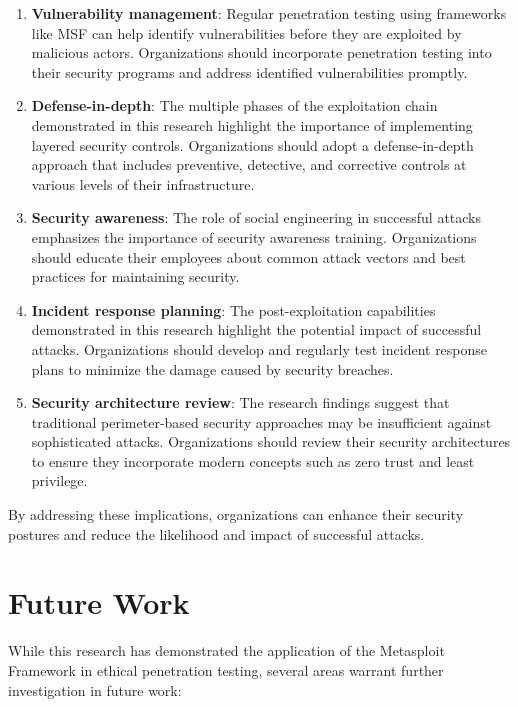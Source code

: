 \documentclass[journal,twoside]{IEEEtran}
\begin{document}
\begin{enumerate}
    \item \textbf{Vulnerability management}: Regular penetration testing using frameworks like MSF can help identify vulnerabilities before they are exploited by malicious actors. Organizations should incorporate penetration testing into their security programs and address identified vulnerabilities promptly.
    
    \item \textbf{Defense-in-depth}: The multiple phases of the exploitation chain demonstrated in this research highlight the importance of implementing layered security controls. Organizations should adopt a defense-in-depth approach that includes preventive, detective, and corrective controls at various levels of their infrastructure.
    
    \item \textbf{Security awareness}: The role of social engineering in successful attacks emphasizes the importance of security awareness training. Organizations should educate their employees about common attack vectors and best practices for maintaining security.
    
    \item \textbf{Incident response planning}: The post-exploitation capabilities demonstrated in this research highlight the potential impact of successful attacks. Organizations should develop and regularly test incident response plans to minimize the damage caused by security breaches.
    
    \item \textbf{Security architecture review}: The research findings suggest that traditional perimeter-based security approaches may be insufficient against sophisticated attacks. Organizations should review their security architectures to ensure they incorporate modern concepts such as zero trust and least privilege.
\end{enumerate}

By addressing these implications, organizations can enhance their security postures and reduce the likelihood and impact of successful attacks.

\section{Future Work}
While this research has demonstrated the application of the Metasploit Framework in ethical penetration testing, several areas warrant further investigation in future work:
\end{document}
